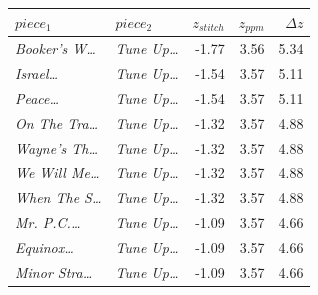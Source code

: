 \begin{tabular}{llrrr}
\toprule
$piece_1$ & $piece_2$ & $z_{stitch}$ & $z_{ppm}$ & $\Delta z$ \\
\midrule
\textit{Booker's W\dots} & \textit{Tune Up\dots} & -1.77 & 3.56 & 5.34 \\
\textit{Israel\dots} & \textit{Tune Up\dots} & -1.54 & 3.57 & 5.11 \\
\textit{Peace\dots} & \textit{Tune Up\dots} & -1.54 & 3.57 & 5.11 \\
\textit{On The Tra\dots} & \textit{Tune Up\dots} & -1.32 & 3.57 & 4.88 \\
\textit{Wayne's Th\dots} & \textit{Tune Up\dots} & -1.32 & 3.57 & 4.88 \\
\textit{We Will Me\dots} & \textit{Tune Up\dots} & -1.32 & 3.57 & 4.88 \\
\textit{When The S\dots} & \textit{Tune Up\dots} & -1.32 & 3.57 & 4.88 \\
\textit{Mr. P.C.\dots} & \textit{Tune Up\dots} & -1.09 & 3.57 & 4.66 \\
\textit{Equinox\dots} & \textit{Tune Up\dots} & -1.09 & 3.57 & 4.66 \\
\textit{Minor Stra\dots} & \textit{Tune Up\dots} & -1.09 & 3.57 & 4.66 \\
\bottomrule
\end{tabular}
